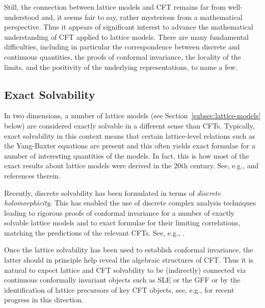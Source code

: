 \documentclass[12pt,oneside,english]{amsart}
\numberwithin{equation}{section}
\numberwithin{figure}{section}
\theoremstyle{plain}
\theoremstyle{plain}
\theoremstyle{plain}
\theoremstyle{plain}
\theoremstyle{remark}
\theoremstyle{definition}
\theoremstyle{plain}
\theoremstyle{plain}
\numberwithin{thm}{section}
\begin{document}
Still, the connection between lattice models and CFT remains far from
well-understood and, it seems fair to say, rather mysterious from
a mathematical perspective. Thus it appears of significant interest
to advance the mathematical understanding of CFT applied to lattice
models. There are many fundamental difficulties, including in particular
the correspondence between discrete and continuous quantities, the
proofs of conformal invariance, the locality of the limits, and the
positivity of the underlying representations, to name a few.

\subsection{\label{subsec:exact-sovability}Exact Solvability}

In two dimensions, a number of lattice models 
(see Section~\ref{subsec:lattice-models}
below) are considered exactly solvable in a different sense than CFTs.
Typically, exact solvability in this context means that certain lattice-level
relations such as the Yang-Baxter equations are present and this often
yields exact formulae for a number of interesting quantities of the
models. In fact, this is how most of the exact results about lattice
models were derived in the 20th century. See, e.g., \cite{baxter}
and references therein.

Recently, discrete solvability has been formulated in terms of \emph{discrete
holomorphicity}. This has enabled the use of discrete complex analysis
techniques leading to rigorous proofs of conformal invariance for
a number of exactly solvable lattice models and to exact formulae
for their limiting correlations, matching the predictions of the relevant
CFTs. See, e.g., 
\cite{kenyon-i,kenyon-ii,smirnov-ii,smirnov-iii,chelkak-hongler-izyurov}.

Once the lattice solvability has been used to establish conformal
invariance, the latter should in principle help reveal the algebraic
structures of CFT. Thus it is natural to expect lattice and CFT solvability
to be (indirectly) connected via continuous conformally invariant
objects such as SLE or the GFF or by the identification of lattice
precursors of key CFT objects, see, e.g., 
\cite{benoist-hongler,dubedat-ii,dubedat-iii,dubedat-v,
chelkak-glazman-smirnov}
for recent progress in this direction.
\end{document}
